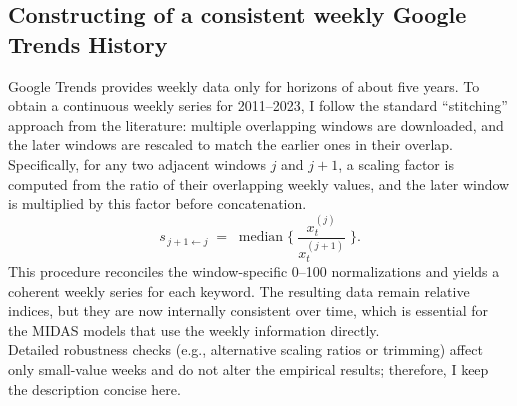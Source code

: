 \documentclass[12pt,a4paper]{article}
\begin{document}
\subsection{Constructing of a consistent weekly Google Trends History}
Google Trends provides weekly data only for horizons of about five years. To obtain a continuous weekly series for 2011–2023, I follow the standard “stitching” approach from the literature: multiple overlapping windows are downloaded, and the later windows are rescaled to match the earlier ones in their overlap.
Specifically, for any two adjacent windows $j$ and $j+1$, a scaling factor is computed from the ratio of their overlapping weekly values, and the later window is multiplied by this factor before concatenation.
\begin{equation}
s_{\,j{+}1 \leftarrow j}
\;=\;
\operatorname{median}
\Big\{\
\frac{x^{(j)}_{t}}{x^{(j+1)}_{t}}
\;\Big\}.
\label{eq:medianratio}
\end{equation}
This procedure reconciles the window-specific 0–100 normalizations and yields a coherent weekly series for each keyword. The resulting data remain relative indices, but they are now internally consistent over time, which is essential for the MIDAS models that use the weekly information directly.\\
Detailed robustness checks (e.g., alternative scaling ratios or trimming) affect only small-value weeks and do not alter the empirical results; therefore, I keep the description concise here.







\newpage
\end{document}
